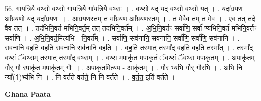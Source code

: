 \documentclass[17pt]{extarticle}
\begin{document}
56. गा॒य॒त्रि॒यै व॒थ्सो व॒थ्सो गा॑यत्रि॒यै गा॑यत्रि॒यै व॒थ्सः । . व॒थ्सो यद् यद् व॒थ्सो व॒थ्सो यत् । . यदा᳚ग्रय॒ण आ᳚ग्रय॒णो यद् यदा᳚ग्रय॒णः । . आ॒ग्र॒य॒णस्तम् त मा᳚ग्रय॒ण आ᳚ग्रय॒णस्तम् । . त मे॒वैव तम् त मे॒व । . ए॒व तत् तदे॒ वैव तत् । . तद॑भिनि॒वर्त॑ मभिनि॒वर्त॒म् तत् तद॑भिनि॒वर्त᳚म् । . अ॒भि॒नि॒वर्तꣳ॒॒ सर्वा॑णि॒ सर्वा᳚ ण्यभिनि॒वर्त॑ मभिनि॒वर्तꣳ॒॒ सर्वा॑णि । . अ॒भि॒नि॒वर्त॒मित्य॑भि - नि॒वर्त᳚म् । . सर्वा॑णि॒ सव॑नानि॒ सव॑नानि॒ सर्वा॑णि॒ सर्वा॑णि॒ सव॑नानि । . सव॑नानि वहति वहति॒ सव॑नानि॒ सव॑नानि वहति । . व॒ह॒ति॒ तस्मा॒त् तस्मा᳚द् वहति वहति॒ तस्मा᳚त् । . तस्मा᳚द् व॒थ्सं ॅव॒थ्सम् तस्मा॒त् तस्मा᳚द् व॒थ्सम् । . व॒थ्स म॒पाकृ॑त म॒पाकृ॑तं ॅव॒थ्सं ॅव॒थ्स म॒पाकृ॑तम् । . अ॒पाकृ॑त॒म् गौर् गौ र॒पाकृ॑त म॒पाकृ॑त॒म् गौः । . अ॒पाकृ॑त॒मित्य॑प - आकृ॑तम् । . गौर॒ भ्य॑भि गौर् गौर॒भि । . अ॒भि नि न्या᳚(1॒)भ्य॑भि नि । . नि व॑र्तते वर्तते॒ नि नि व॑र्तते । . व॒र्त॒त॒ इति॑ वर्तते । \newline

\textbf{Ghana Paata } \newline
\end{document}
